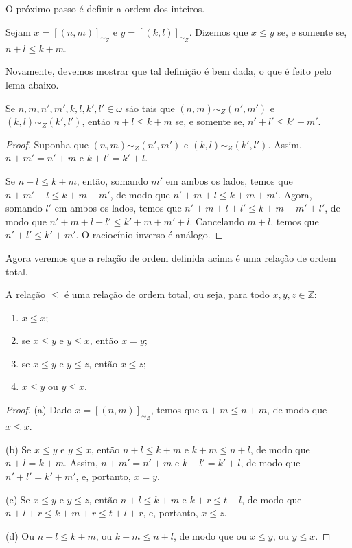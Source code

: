O próximo passo é definir a ordem dos inteiros.
\begin{definition}
    Sejam $x=[(n, m)]_{\sim_Z}$ e $y=[(k, l)]_{\sim_Z}$.
    Dizemos que $x\leq y$ se, e somente se, $n+l\leq k+m$.
\end{definition}
Novamente, devemos mostrar que tal definição é bem dada, o que é feito pelo lema abaixo.
\begin{lemma}\label{lem:relacaoDeOrdemNosInteirosBemDefinida}
    Se $n, m, n', m', k, l, k', l' \in \omega$ são tais que $(n, m)\sim_Z (n', m')$ e $(k, l)\sim_Z (k', l')$, então $n+l\leq k+m$ se, e somente se, $n'+l'\leq k'+m'$.
\end{lemma}
\begin{proof}
    Suponha que $(n, m)\sim_Z (n', m')$ e $(k, l)\sim_Z (k', l')$.
    Assim, $n+m'=n'+m$ e $k+l'=k'+l$.

    Se $n+l\leq k+m$, então, somando $m'$ em ambos os lados, temos que $n+m'+l\leq k+m+m'$, de modo que $n'+m+l\leq k+m+m'$.
    Agora, somando $l'$ em ambos os lados, temos que $n'+m+l+l'\leq k+m+m'+l'$, de modo que $n'+m+l+l'\leq k'+m+m'+l$.
    Cancelando $m+l$, temos que $n'+l'\leq k'+m'$.
    O raciocínio inverso é análogo.
\end{proof}

Agora veremos que a relação de ordem definida acima é uma relação de ordem total.
\begin{proposition}
    A relação $\leq$ é uma relação de ordem total, ou seja, para todo $x, y, z \in \mathbb Z$:
    \begin{enumerate}[label=(\alph*)]
        \item $x\leq x$;
        \item se $x\leq y$ e $y\leq x$, então $x=y$;
        \item se $x\leq y$ e $y\leq z$, então $x\leq z$;
        \item $x\leq y$ ou $y\leq x$.
    \end{enumerate}
\end{proposition}
\begin{proof}\hfill
    \par (a) Dado $x=[(n, m)]_{\sim_Z}$, temos que $n+m\leq n+m$, de modo que $x\leq x$.

    (b) Se $x\leq y$ e $y\leq x$, então $n+l\leq k+m$ e $k+m\leq n+l$, de modo que $n+l=k+m$.
    Assim, $n+m'=n'+m$ e $k+l'=k'+l$, de modo que $n'+l'=k'+m'$, e, portanto, $x=y$.

    (c) Se $x\leq y$ e $y\leq z$, então $n+l\leq k+m$ e $k+r\leq t+l$, de modo que $n+l+r\leq k+m+r\leq t+l+r$, e, portanto, $x\leq z$.

    (d) Ou $n+l\leq k+m$, ou $k+m\leq n+l$, de modo que ou $x\leq y$, ou $y\leq x$.
\end{proof}

